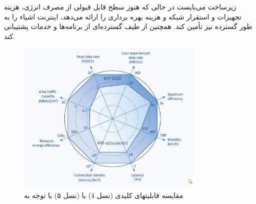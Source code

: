 زیرساخت
می‌بایست
در حالی که هنوز سطح قابل قبولی از مصرف انرژی، هزینه تجهیزات و استقرار شبکه و هزینه بهره برداری را ارائه می‌دهد،
 اینترنت اشیاء را به طور گسترده نیز تأمین کند.
 همچنین
از طیف گسترده‌ای از برنامه‌ها و خدمات پشتیبانی کند.
 \begin{figure}[H]
  \centering
    \includegraphics[width=0.8\textwidth]{./fig/etsi}
  \caption{مقایسه قابلیتهای کلیدی
 (نسل 4) با
 (نسل ۵) 
 با توجه به
\cite{etsi}
  }
  \label{fig:C-RAN}
\end{figure}

